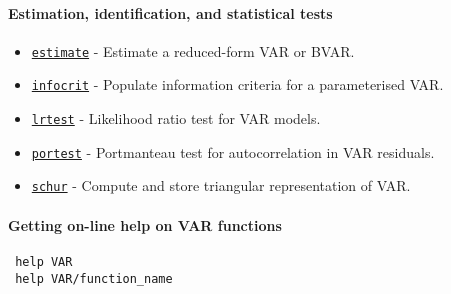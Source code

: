  \paragraph{Estimation, identification, and statistical tests}
 
 \begin{itemize}
 \item
   \href{VAR/estimate}{\texttt{estimate}} - Estimate a reduced-form VAR
   or BVAR.
 \item
   \href{VAR/infocrit}{\texttt{infocrit}} - Populate information criteria
   for a parameterised VAR.
 \item
   \href{VAR/lrtest}{\texttt{lrtest}} - Likelihood ratio test for VAR
   models.
 \item
   \href{VAR/portest}{\texttt{portest}} - Portmanteau test for
   autocorrelation in VAR residuals.
 \item
   \href{VAR/schur}{\texttt{schur}} - Compute and store triangular
   representation of VAR.
 \end{itemize}
 
 \paragraph{Getting on-line help on VAR functions}
 
 \begin{verbatim}
 help VAR
 help VAR/function_name
 \end{verbatim}




